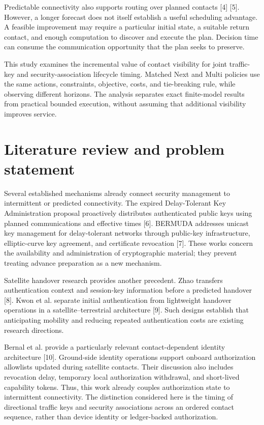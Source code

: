 \documentclass[12pt,a4paper]{article}
\begin{document}
Predictable connectivity also supports routing over planned contacts [4] [5]. However, a longer forecast does not itself establish a useful scheduling advantage. A feasible improvement may require a particular initial state, a suitable return contact, and enough computation to discover and execute the plan. Decision time can consume the communication opportunity that the plan seeks to preserve.

This study examines the incremental value of contact visibility for joint traffic-key and security-association lifecycle timing. Matched Next and Multi policies use the same actions, constraints, objective, costs, and tie-breaking rule, while observing different horizons. The analysis separates exact finite-model results from practical bounded execution, without assuming that additional visibility improves service.

\section*{Literature review and problem statement}
Several established mechanisms already connect security management to intermittent or predicted connectivity. The expired Delay-Tolerant Key Administration proposal proactively distributes authenticated public keys using planned communications and effective times [6]. BERMUDA addresses unicast key management for delay-tolerant networks through public-key infrastructure, elliptic-curve key agreement, and certificate revocation [7]. These works concern the availability and administration of cryptographic material; they prevent treating advance preparation as a new mechanism.

Satellite handover research provides another precedent. Zhao transfers authentication context and session-key information before a predicted handover [8]. Kwon et al. separate initial authentication from lightweight handover operations in a satellite--terrestrial architecture [9]. Such designs establish that anticipating mobility and reducing repeated authentication costs are existing research directions.

Bernal et al. provide a particularly relevant contact-dependent identity architecture [10]. Ground-side identity operations support onboard authorization allowlists updated during satellite contacts. Their discussion also includes revocation delay, temporary local authorization withdrawal, and short-lived capability tokens. Thus, this work already couples authorization state to intermittent connectivity. The distinction considered here is the timing of directional traffic keys and security associations across an ordered contact sequence, rather than device identity or ledger-backed authorization.
\end{document}
